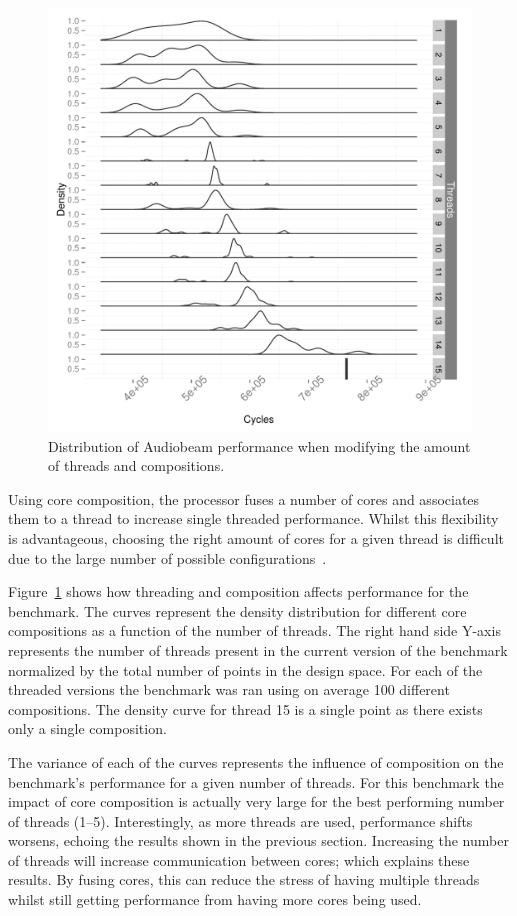 \begin{figure}[h]
  \includegraphics[width=1\textwidth]{streamit-paper/graphics/audiobeam_tots.pdf}
  \caption{Distribution of Audiobeam performance when modifying the amount of threads and compositions.}\label{fig:audiototal}
\end{figure}
Using core composition, the processor fuses a number of cores and associates them to a thread to increase single threaded performance.
Whilst this flexibility is advantageous, choosing the right amount of cores for a given thread is difficult due to the large number of possible configurations~\cite{gulati2008multitaskingdmc}.

Figure~\ref{fig:audiototal} shows how threading and composition affects performance for the  benchmark.
The curves represent the density distribution for different core compositions as a function of the number of threads.
The right hand side Y-axis represents the number of threads present in the current version of the benchmark normalized by the total number of points in the design space.
For each of the threaded versions the benchmark was ran using on average 100 different compositions.
The density curve for thread 15 is a single point as there exists only a single composition.

The variance of each of the curves represents the influence of composition on the benchmark's performance for a given number of threads.
For this benchmark the impact of core composition is actually very large for the best performing number of threads (1--5).
Interestingly, as more threads are used,  performance shifts worsens, echoing the results shown in the previous section.
Increasing the number of threads will increase communication between cores; which explains these results.
By fusing cores, this can reduce the stress of having multiple threads whilst still getting performance from having more cores being used.

